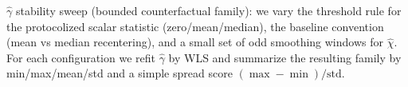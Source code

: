 \noindent\AuditTag $\widehat\gamma$ stability sweep (bounded counterfactual family): we vary the threshold rule for the protocolized scalar statistic (zero/mean/median), the baseline convention (mean vs median recentering), and a small set of odd smoothing windows for $\widehat\chi$. For each configuration we refit $\widehat\gamma$ by WLS and summarize the resulting family by min/max/mean/std and a simple spread score $(\max-\min)/\mathrm{std}$.